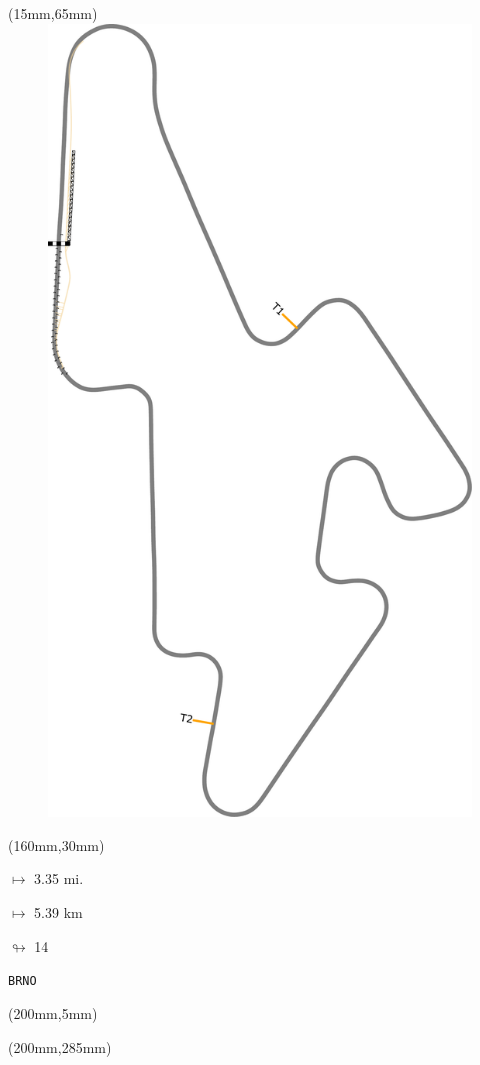 \begin{textblock*}{185mm}(15mm,65mm)%
\centering
\mbox{\includegraphics[width=185mm,height=210mm,keepaspectratio]{PT/BRNO.pdf}}
\end{textblock*}
\begin{textblock*}{40mm}(160mm,30mm)%
\Large
\par$\mapsto$ 3.35 mi.
\par$\mapsto$ 5.39 km
\par$\looparrowright$ 14
\par\hfill\tiny\tt BRNO\\
\end{textblock*}
\begin{textblock*}{20mm}(200mm,5mm)%
\fbox{\thepage}
\label{BRNO}
\end{textblock*}
\begin{textblock*}{20mm}(200mm,285mm)%
\fbox{\thepage}
\end{textblock*}

